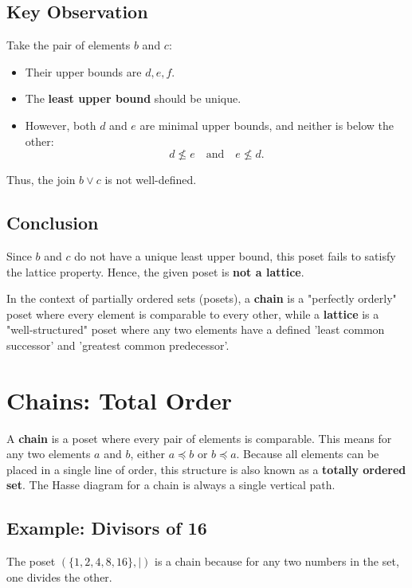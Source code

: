 \documentclass[10pt]{article}
\theoremstyle{definition}
\theoremstyle{plain}
\numberwithin{equation}{section}
\begin{document}
\subsection*{Key Observation}
Take the pair of elements $b$ and $c$:
\begin{itemize}
\item Their upper bounds are ${d, e, f}$.
\item The \textbf{least upper bound} should be unique.
\item However, both $d$ and $e$ are minimal upper bounds, and neither is below the other:
\[
d \nleq e \quad \text{and} \quad e \nleq d.
\]
\end{itemize}

Thus, the join $b \vee c$ is not well-defined.

\subsection*{Conclusion}
Since $b$ and $c$ do not have a unique least upper bound, this poset fails to satisfy the lattice property. Hence, the given poset is \textbf{not a lattice}.





\newpage


In the context of partially ordered sets (posets), a \textbf{chain} is a "perfectly orderly" poset where every element is comparable to every other, while a \textbf{lattice} is a "well-structured" poset where any two elements have a defined 'least common successor' and 'greatest common predecessor'.

\section*{Chains: Total Order}

A \textbf{chain} is a poset where every pair of elements is comparable. This means for any two elements $a$ and $b$, either $a \preceq b$ or $b \preceq a$. Because all elements can be placed in a single line of order, this structure is also known as a \textbf{totally ordered set}. The Hasse diagram for a chain is always a single vertical path.

\subsection*{Example: Divisors of 16}
The poset $(\{1, 2, 4, 8, 16\}, \mid)$ is a chain because for any two numbers in the set, one divides the other.
\end{document}
